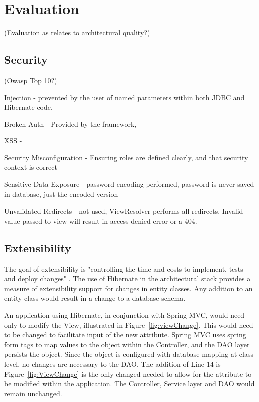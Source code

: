 \chapter{Evaluation}
\label{evaluation}

(Evaluation as relates to architectural quality?)

\section{Security}
(Owasp Top 10?)

Injection - prevented by the user of named parameters within both JDBC and Hibernate code.

Broken Auth - Provided by the framework, 

XSS - 

Security Misconfiguration - Ensuring roles are defined clearly, and that security context is correct

Sensitive Data Exposure - password encoding performed, password is never saved in database, just the encoded version

Unvalidated Redirects - not used, ViewResolver performs all redirects. Invalid value passed to view will result in access denied error or a 404.


\section{Extensibility}

The goal of extensibility is "controlling the time and costs to implement, tests and deploy changes" \parencite{bass2003software}. The use of Hibernate in the architectural stack provides a measure of extensibility support for changes in entity classes. Any addition to an entity class would result in a change to a database schema. 

An application using Hibernate, in conjunction with Spring MVC, would need only to modify the View, illustrated in Figure~\ref{fig:viewChange}. This would need to be changed to facilitate input of the new attribute. Spring MVC uses spring form tags to map values to the object within the Controller, and the DAO layer persists the object. Since the object is configured with database mapping at class level, no changes are necessary to the DAO. The addition of Line 14 is Figure~\ref{fig:ViewChange} is the only changed needed to allow for the attribute to be modified within the application. The Controller, Service layer and DAO would remain unchanged.

